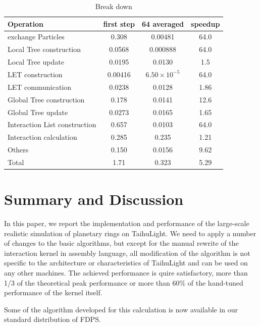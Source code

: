 \documentclass[oribibl]{llncs}
\begin{document}
\begin{table}
  \caption{Break down}
  \label{tab:break_down}
  \begin{tabular}{lccc}
    \toprule
    Operation & first step & 64 averaged & speedup\\
    \midrule
    exchange Particles            & 0.308   & 0.00481  & 64.0 \\
    Local Tree construction       & 0.0568  & 0.000888 & 64.0 \\
    Local Tree update             & 0.0195  & 0.0130   & 1.5 \\
    LET construction              & 0.00416 &  $6.50 \times 10^{-5}$  & 64.0 \\
    LET communication             & 0.0238  & 0.0128   & 1.86 \\
    Global Tree construction      & 0.178   & 0.0141   & 12.6 \\
    Global Tree update                 & 0.0273  & 0.0165   & 1.65 \\
    Interaction List construction & 0.657   & 0.0103   & 64.0 \\
    Interaction calculation       & 0.285   & 0.235    & 1.21 \\
    Others                        & 0.150   & 0.0156   & 9.62 \\
    \midrule
    Total                         & 1.71   & 0.323     & 5.29 \\
  \bottomrule
  \end{tabular}
\end{table}

\section{Summary and Discussion}

In this paper, we report the implementation and performance of the
large-scale realistic simulation of planetary rings on TaihuLight.  We
need to apply a number of changes to the basic algorithms, but except
for the manual rewrite of the interaction kernel in assembly language,
all modification of the algorithm is not specific to the architecture
or characteristics of TaihuLight and can be used on any other
machines. The achieved performance is quire satisfactory, more than
1/3 of the theoretical peak performance or more than 60\% of the
hand-tuned performance of the kernel itself.

Some of the algorithm developed for this calculation is now available
in our standard distribution of FDPS.
\end{document}
